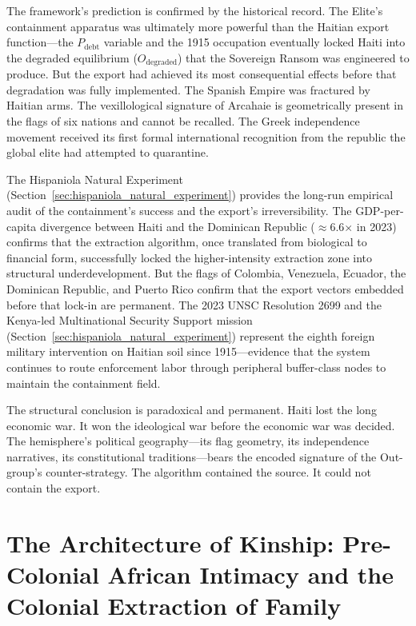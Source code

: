 The framework's prediction is confirmed by the historical record. The Elite's containment apparatus was ultimately more powerful than the Haitian export function---the $P_{\text{debt}}$ variable and the 1915 occupation eventually locked Haiti into the degraded equilibrium ($O_{\text{degraded}}$) that the Sovereign Ransom was engineered to produce. But the export had achieved its most consequential effects before that degradation was fully implemented. The Spanish Empire was fractured by Haitian arms. The vexillological signature of Arcahaie is geometrically present in the flags of six nations and cannot be recalled. The Greek independence movement received its first formal international recognition from the republic the global elite had attempted to quarantine.

The Hispaniola Natural Experiment (Section~\ref{sec:hispaniola_natural_experiment}) provides the long-run empirical audit of the containment's success and the export's irreversibility. The GDP-per-capita divergence between Haiti and the Dominican Republic ($\approx$6.6$\times$ in 2023) confirms that the extraction algorithm, once translated from biological to financial form, successfully locked the higher-intensity extraction zone into structural underdevelopment. But the flags of Colombia, Venezuela, Ecuador, the Dominican Republic, and Puerto Rico confirm that the export vectors embedded before that lock-in are permanent. The 2023 UNSC Resolution 2699 and the Kenya-led Multinational Security Support mission (Section~\ref{sec:hispaniola_natural_experiment}) represent the eighth foreign military intervention on Haitian soil since 1915---evidence that the system continues to route enforcement labor through peripheral buffer-class nodes to maintain the containment field.

The structural conclusion is paradoxical and permanent. Haiti lost the long economic war. It won the ideological war before the economic war was decided. The hemisphere's political geography---its flag geometry, its independence narratives, its constitutional traditions---bears the encoded signature of the Out-group's counter-strategy. The algorithm contained the source. It could not contain the export.

\FloatBarrier

\chapter{The Architecture of Kinship: Pre-Colonial African Intimacy and the Colonial Extraction of Family}
\label{ch:kinship}

